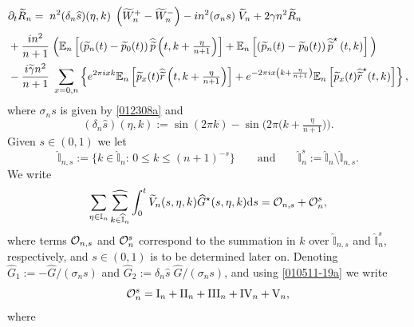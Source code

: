 \documentclass[EJP]{ejpecp} %
\newcommand{\bb}[1]{{\mathbb #1}}
\newcommand\T{{\mathbb I}}
\newcommand \ga{\gamma}
\renewcommand{\le}{\leqslant}
\newcommand{\dd  }{\mathrm{d}}
\renewcommand{\hat}{\widehat}
\renewcommand{\tilde}{\widetilde}
\numberwithin{equation}{section}
\begin{document}
\begin{align}\label{010511-19a} 
&\partial_t \tilde R_n =\; n^2 (\delta_n \hat s)(\eta,k)\;
\left(\tilde W_n^+-\tilde W_n^-\right)-i n^2 (\sigma_n s) \; \tilde V_n \vphantom{\int} 
+ 2\gamma
n^2\tilde R_n\vphantom{\int} \\
&
\vphantom{\int}
+\frac{in^2}{n+1}\; \Big(\bb E_n\left[
    \left(\tilde p_n(t)-\tilde p_0(t)\right)\hat{\tilde{p}}\left(t,k+\tfrac{\eta}{n+1}\right)\right]+
\bb E_n\left[\left(\tilde p_n(t)-\tilde
  p_0(t)\right)\hat{\tilde{p}}^\star\left(t,k\right)\right]\Big)\notag\\
&
-\frac{i\tilde \ga n^2}{n+1}\; \sum_{x=0,n}\left\{e^{2\pi i x k}\bb E_n\left[
   \tilde  p_{x}(t)\hat{\tilde r}\left(t,k+\tfrac{\eta}{n+1}\right)
  \right]
+
e^{-2\pi i x \left(k+\frac{\eta}{n+1}\right)}\bb E_n\left[\tilde  p_{x}(t) \hat{\tilde r}^\star(t,k)\right]\right\},\notag
\end{align} 
where $\sigma_n s$ is given by \eqref{012308a} and 
$$
(\delta_n \hat s)(\eta,k):=\sin(2\pi
  k)-\sin\big(2\pi\big(k+\tfrac{\eta}{n+1}\big)\big).
$$
Given $s\in(0,1)$ we let
$$
\hat\T_{n,s}:=\big\{k\in\hat\T_n :\,0\le k\le (n+1)^{-s}\big\}\qquad\mbox{and}\qquad
\hat\T_n^s:=\hat \T_n\setminus \hat\T_{n,s}.
$$
 We  write
\begin{equation}
\label{050511-19}
\sum_{\eta\in\T_n}\underset{{k\in \widehat{\T}_n}}{{\hat\sum}}\int_0^t\tilde V_n(s,\eta,k) \hat G^\star(s,\eta,k)\dd
  s={\cal O}_{n,s}+{\cal O}_n^s,
\end{equation}
where terms ${\cal O}_{n,s}$ and ${\cal O}_n^s $ correspond to the summation in $k$
over $\hat\T_{n,s}$ and $\hat\T_n^s$, respectively, and $s\in(0,1)$ is to be determined later on.
Denoting $\hat G_1:=-\hat G/(\sigma_n s)$ and $\hat G_2:=\delta_n \hat s\; \hat G/(\sigma_n s)$, and using \eqref{010511-19a} we  write
\begin{equation}\label{eq:decompO} {\cal O}_{n}^s=\mathrm{I}_n+\mathrm{II}_n+\mathrm{III}_n+\mathrm{IV}_{n}+\mathrm{V}_{n},\end{equation}
where
\end{document}
